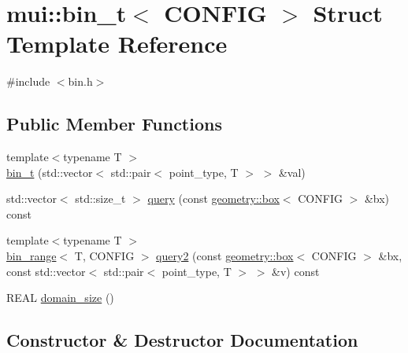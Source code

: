 \hypertarget{structmui_1_1bin__t}{}\section{mui\+:\+:bin\+\_\+t$<$ C\+O\+N\+F\+IG $>$ Struct Template Reference}
\label{structmui_1_1bin__t}


{\ttfamily \#include $<$bin.\+h$>$}

\subsection*{Public Member Functions}
\begin{DoxyCompactItemize}
\item 
{\footnotesize template$<$typename T $>$ }\\\hyperlink{structmui_1_1bin__t_a7b3d0531b0b1e7e96d2140366af04ad9}{bin\+\_\+t} (std\+::vector$<$ std\+::pair$<$ point\+\_\+type, T $>$ $>$ \&val)
\item 
std\+::vector$<$ std\+::size\+\_\+t $>$ \hyperlink{structmui_1_1bin__t_a91b139f0c12749291bc477f18b540529}{query} (const \hyperlink{classmui_1_1geometry_1_1box}{geometry\+::box}$<$ C\+O\+N\+F\+IG $>$ \&bx) const
\item 
{\footnotesize template$<$typename T $>$ }\\\hyperlink{structmui_1_1bin__range}{bin\+\_\+range}$<$ T, C\+O\+N\+F\+IG $>$ \hyperlink{structmui_1_1bin__t_abda7b56b8f16c788edef7ffa446945b9}{query2} (const \hyperlink{classmui_1_1geometry_1_1box}{geometry\+::box}$<$ C\+O\+N\+F\+IG $>$ \&bx, const std\+::vector$<$ std\+::pair$<$ point\+\_\+type, T $>$ $>$ \&v) const
\item 
R\+E\+AL \hyperlink{structmui_1_1bin__t_a10d7dcbebbd3e27e9b14c53657a58194}{domain\+\_\+size} ()
\end{DoxyCompactItemize}


\subsection{Constructor \& Destructor Documentation}
\mbox{\label{structmui_1_1bin__t_a7b3d0531b0b1e7e96d2140366af04ad9}} 
